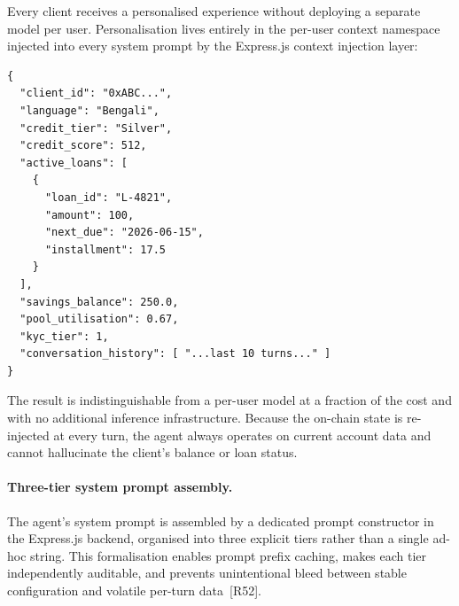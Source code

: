 \documentclass[12pt,a4paper]{report}
\begin{document}
Every client receives a personalised experience without deploying a separate model per user. Personalisation lives entirely in the per-user context namespace injected into every system prompt by the Express.js context injection layer:

\begin{verbatim}
{
  "client_id": "0xABC...",
  "language": "Bengali",
  "credit_tier": "Silver",
  "credit_score": 512,
  "active_loans": [
    {
      "loan_id": "L-4821",
      "amount": 100,
      "next_due": "2026-06-15",
      "installment": 17.5
    }
  ],
  "savings_balance": 250.0,
  "pool_utilisation": 0.67,
  "kyc_tier": 1,
  "conversation_history": [ "...last 10 turns..." ]
}
\end{verbatim}

\noindent The result is indistinguishable from a per-user model at a fraction of the cost and with no additional inference infrastructure. Because the on-chain state is re-injected at every turn, the agent always operates on current account data and cannot hallucinate the client's balance or loan status.

\paragraph{Three-tier system prompt assembly.}

The agent's system prompt is assembled by a dedicated prompt constructor in the
Express.js backend, organised into three explicit tiers rather than a single
ad-hoc string. This formalisation enables prompt prefix caching, makes each tier
independently auditable, and prevents unintentional bleed between stable
configuration and volatile per-turn data~[R52].
\end{document}
